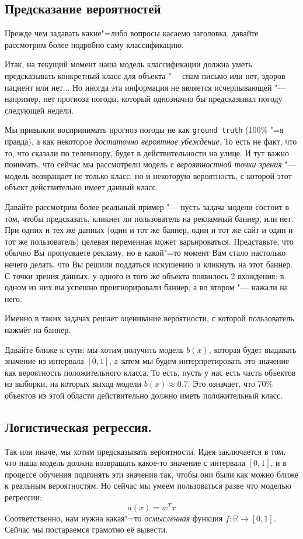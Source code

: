 \subsection*{Предсказание вероятностей}
Прежде чем задавать какие"=либо вопросы касаемо заголовка, давайте рассмотрим более подробно саму классификацию.

Итак, на текущий момент наша модель классификации должна уметь предсказывать конкретный класс для объекта "--- спам письмо или нет, здоров пациент или нет... Но иногда эта информация не является исчерпывающей "--- например, нет прогноза погоды, который однозначно бы предсказывал погоду следующей недели.

Мы привыкли воспринимать прогноз погоды не как \texttt{ground truth} (100\% "=я правда), а как некоторое \textit{достаточно вероятное убеждение}. То есть не факт, что то, что сказали по телевизору, будет в действительности на улице. И тут важно понимать, что сейчас мы рассмотрели модель с \textit{вероятностной точки зрения} "--- модель возвращает не только класс, но и некоторую вероятность, с которой этот объект действительно имеет данный класс.

Давайте рассмотрим более реальный пример "--- пусть задача модели состоит в том, чтобы предсказать, кликнет ли пользователь на рекламный баннер, или нет. При одних и тех же данных (один и тот же баннер, один и тот же сайт и один и тот же пользователь) целевая переменная может варьироваться. Представьте, что обычно Вы пропускаете рекламу, но в какой"=то момент Вам стало настолько нечего делать, что Вы решили поддаться искушению и кликнуть на этот баннер. С точки зрения данных, у одного и того же объекта появилось 2 вхождения: в одном из них вы успешно проигнорировали баннер, а во втором "--- нажали на него.

Именно в таких задачах решает оценивание вероятности, с которой пользователь нажмёт на баннер.

Давайте ближе к сути: мы хотим получить модель $b(x)$, которая будет выдавать значение из интервала $[0, 1]$, а затем мы будем интерпретировать это значение как вероятность положительного класса. То есть, пусть у нас есть часть объектов из выборки, на которых выход модели $b(x) \approx 0.7$. Это означает, что 70\% объектов из этой области действительно должно иметь положительный класс.

\newpage

\subsection*{Логистическая регрессия.}
Так или иначе, мы хотим предсказывать вероятности. Идея заключается в том, что наша модель должна возвращать какое-то значение с интервала $[0, 1]$, и в процессе обучения подгонять эти значения так, чтобы они были как можно ближе к реальным вероятностям. Но сейчас мы умеем пользоваться разве что моделью регрессии:
\[
a(x) = w^Tx
\]
Соответственно, нам нужна какая"=то \textit{осмысленная} функция $f: \mathbb{R} \rightarrow [0, 1]$. Сейчас мы постараемся грамотно её вывести.

